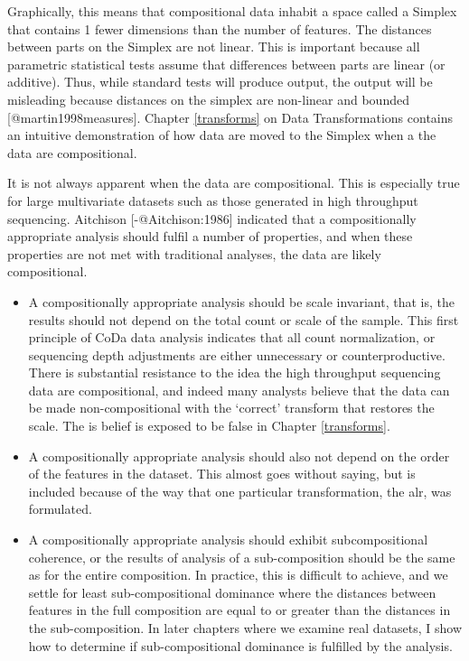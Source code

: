 \documentclass[
  onecolumn]{article}
\begin{document}
Graphically, this means that compositional data inhabit a space called a Simplex that contains 1 fewer dimensions than the number of features. The distances between parts on the Simplex are not linear. This is important because all parametric statistical tests assume that differences between parts are linear (or additive). Thus, while standard tests will produce output, the output will be misleading because distances on the simplex are non-linear and bounded {[}@martin1998measures{]}. Chapter \ref{transforms} on Data Transformations contains an intuitive demonstration of how data are moved to the Simplex when a the data are compositional.

It is not always apparent when the data are compositional. This is especially true for large multivariate datasets such as those generated in high throughput sequencing. Aitchison {[}-@Aitchison:1986{]} indicated that a compositionally appropriate analysis should fulfil a number of properties, and when these properties are not met with traditional analyses, the data are likely compositional.

\begin{itemize}
\item
  A compositionally appropriate analysis should be scale invariant, that is, the results should not depend on the total count or scale of the sample. This first principle of CoDa data analysis indicates that all count normalization, or sequencing depth adjustments are either unnecessary or counterproductive. There is substantial resistance to the idea the high throughput sequencing data are compositional, and indeed many analysts believe that the data can be made non-compositional with the `correct' transform that restores the scale. The is belief is exposed to be false in Chapter \ref{transforms}.
\item
  A compositionally appropriate analysis should also not depend on the order of the features in the dataset. This almost goes without saying, but is included because of the way that one particular transformation, the alr, was formulated.
\item
  A compositionally appropriate analysis should exhibit subcompositional coherence, or the results of analysis of a sub-composition should be the same as for the entire composition. In practice, this is difficult to achieve, and we settle for least sub-compositional dominance where the distances between features in the full composition are equal to or greater than the distances in the sub-composition. In later chapters where we examine real datasets, I show how to determine if sub-compositional dominance is fulfilled by the analysis.
\end{itemize}
\end{document}

